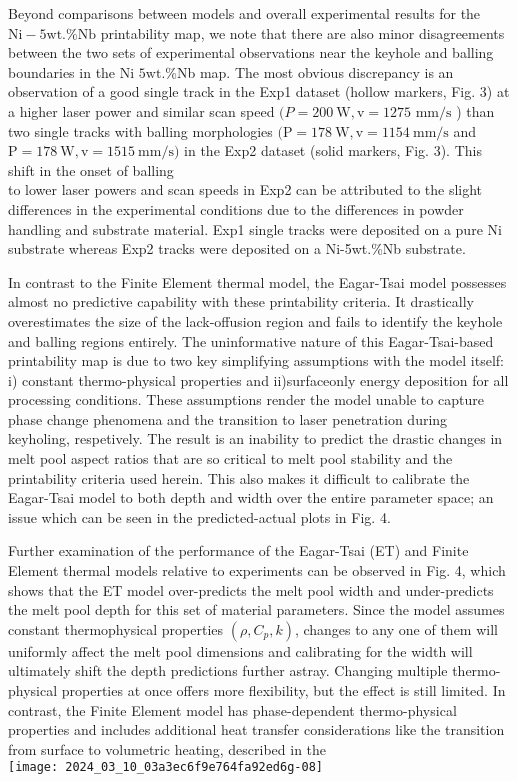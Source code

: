 \documentclass[10pt]{article}
\begin{document}
Beyond comparisons between models and overall experimental results for the $\mathrm{Ni}-5 \mathrm{wt} . \% \mathrm{Nb}$ printability map, we note that there are also minor disagreements between the two sets of experimental observations near the keyhole and balling boundaries in the $\mathrm{Ni}$ $5 \mathrm{wt}$.\%Nb map. The most obvious discrepancy is an observation of a good single track in the Exp1 dataset (hollow markers, Fig. 3) at a higher laser power and similar scan speed $(P=200 \mathrm{~W}, \mathrm{v}=1275$ $\mathrm{mm} / \mathrm{s}$ ) than two single tracks with balling morphologies $(\mathrm{P}=178 \mathrm{~W}, \mathrm{v}=1154 \mathrm{~mm} / \mathrm{s}$ and $\mathrm{P}=178 \mathrm{~W}, \mathrm{v}=1515 \mathrm{~mm} / \mathrm{s})$ in the Exp2 dataset (solid markers, Fig. 3). This shift in the onset of balling\\
to lower laser powers and scan speeds in Exp2 can be attributed to the slight differences in the experimental conditions due to the differences in powder handling and substrate material. Exp1 single tracks were deposited on a pure Ni substrate whereas Exp2 tracks were deposited on a Ni-5wt.\%Nb substrate.

In contrast to the Finite Element thermal model, the Eagar-Tsai model possesses almost no predictive capability with these printability criteria. It drastically overestimates the size of the lack-offusion region and fails to identify the keyhole and balling regions entirely. The uninformative nature of this Eagar-Tsai-based printability map is due to two key simplifying assumptions with the model itself: i) constant thermo-physical properties and ii)surfaceonly energy deposition for all processing conditions. These assumptions render the model unable to capture phase change phenomena and the transition to laser penetration during keyholing, respetively. The result is an inability to predict the drastic changes in melt pool aspect ratios that are so critical to melt pool stability and the printability criteria used herein. This also makes it difficult to calibrate the Eagar-Tsai model to both depth and width over the entire parameter space; an issue which can be seen in the predicted-actual plots in Fig. 4.

Further examination of the performance of the Eagar-Tsai (ET) and Finite Element thermal models relative to experiments can be observed in Fig. 4, which shows that the ET model over-predicts the melt pool width and under-predicts the melt pool depth for this set of material parameters. Since the model assumes constant thermophysical properties $\left(\rho, C_{p}, k\right)$, changes to any one of them will uniformly affect the melt pool dimensions and calibrating for the width will ultimately shift the depth predictions further astray. Changing multiple thermo-physical properties at once offers more flexibility, but the effect is still limited. In contrast, the Finite Element model has phase-dependent thermo-physical properties and includes additional heat transfer considerations like the transition from surface to volumetric heating, described in the\\
\texttt{[image: 2024\_03\_10\_03a3ec6f9e764fa92ed6g-08]}
\end{document}

